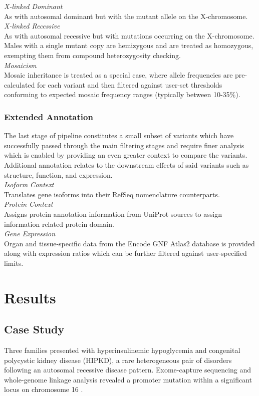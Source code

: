 \documentclass[twocolumn]{bmcart}%
\newcommand{\triplesub}[2]{\noindent\textsl{#1}\\#2\\}  %
\begin{document}
\triplesub{X-linked Dominant}{As with autosomal dominant but with the mutant allele on the X-chromosome.}

\triplesub{X-linked Recessive}{
As with autosomal recessive but with mutations occurring on the X-chromosome. Males with a single mutant copy are hemizygous and are treated as homozygous, exempting them from compound heterozygosity checking.}


\triplesub{Mosaicism}{Mosaic inheritance is treated as a special case, where allele frequencies are pre-calculated for each variant and then filtered against user-set thresholds conforming to expected mosaic frequency ranges (typically between 10-35\%).}




\subsubsection{Extended Annotation}

The last stage of pipeline constitutes a small subset of variants which have successfully passed through the main filtering stages and require finer analysis which is enabled by providing an even greater context to compare the variants. Additional annotation relates to the downstream effects of said variants such as structure, function, and expression.\\


\triplesub{Isoform Context}{Translates gene isoforms into their RefSeq nomenclature counterparts.}

\triplesub{Protein Context}{Assigns protein annotation information from UniProt sources to assign information related protein domain.}

\triplesub{Gene Expression}{Organ and tissue-specific data from the Encode GNF Atlas2 database is provided along with expression ratios which can be further filtered against user-specified limits.}


\section*{Results}

\subsection*{Case Study}

Three families presented with hyperinsulinemic hypoglycemia and congenital polycystic kidney disease (HIPKD), a rare heterogeneous pair of disorders following an autosomal recessive disease pattern. Exome-capture sequencing and whole-genome linkage analysis revealed a promoter mutation within a significant locus on chromosome 16 \cite{cabezas2017polycystic}.
\end{document}
